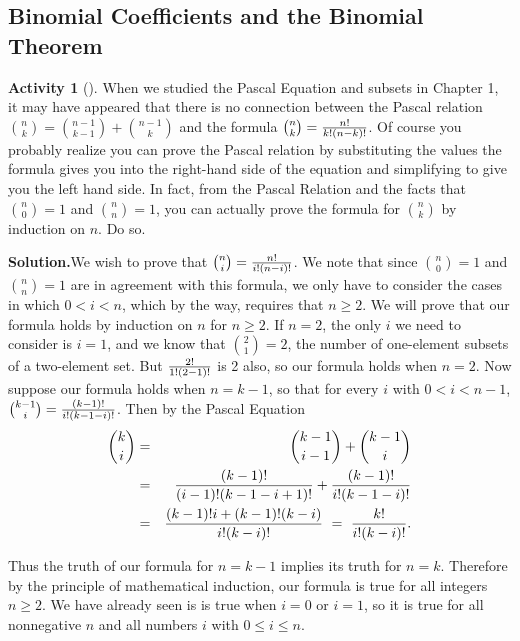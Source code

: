 \documentclass[10pt,]{book}
\theoremstyle{plain}
\theoremstyle{definition}
\newtheorem{activity}[project]{Activity}
\numberwithin{equation}{chapter}
\newcommand{\lt}{<}
\newcommand{\amp}{&}
\begin{document}
\subsection[{Binomial Coefficients and the Binomial Theorem}]{Binomial Coefficients and the Binomial Theorem}\label{subsection-6}
\begin{activity}[]\label{activity-25}
When we studied the Pascal Equation and subsets in Chapter 1, it may have appeared that there is no connection between the Pascal relation \({n\choose k} = {n-1\choose k-1} +{n-1\choose k}\) and the formula \({n\choose k}={n!\over k!(n-k)!}\). Of course you probably realize you can prove the Pascal relation by substituting the values the formula gives you into the right-hand side of the equation and simplifying to give you the left hand side. In fact, from the Pascal Relation and the facts that \({n\choose 0}=1\) and \({n\choose n}=1\), you can actually prove the formula for \(n\choose k\) by induction on \(n\). Do so.%
\par\medskip\noindent%
\textbf{Solution.}\quad We wish to prove that \({n\choose i} ={n!\over i!(n-i)!}\). We note that since \({n\choose 0}=1\) and \({n\choose n} =1\) are in agreement with this formula, we only have to consider the cases in which \(0\lt i\lt n\), which by the way, requires that \(n\ge 2\). We will prove that our formula holds by induction on \(n\) for \(n\ge 2\). If \(n=2\), the only \(i\) we need to consider is \(i=1\), and we know that \({2\choose1}=2\), the number of one-element subsets of a two-element set. But \(2!\over1!(2-1)!\) is 2 also, so our formula holds when \(n=2\). Now suppose our formula holds when \(n=k-1\), so that for every \(i\) with \(0\lt i\lt n-1\), \({k-1\choose i} =
{(k-1)!\over i!(k-1-i)!}\). Then by the Pascal Equation%
\begin{align*}
{k\choose i}\amp =\amp {k-1\choose i-1}+{k-1\choose i}\\
\amp =\amp
{(k-1)!\over (i-1)!(k-1-i+1)!} + {(k-1)!\over
i!(k-1-i)!}\\
\amp =\amp {(k-1)!i+(k-1)!(k-i)\over i!(k-i)!} \ =\  {k!\over
i!(k-i)!}.
\end{align*}
%
\par
Thus the truth of our formula for \(n=k-1\) implies its truth for \(n=k\). Therefore by the principle of mathematical induction, our formula is true for all integers \(n\ge 2\). We have already seen is is true when \(i=0\) or \(i=1\), so it is true for all nonnegative \(n\) and all numbers \(i\) with \(0\le i\le n\).%
\end{activity}
\end{document}
